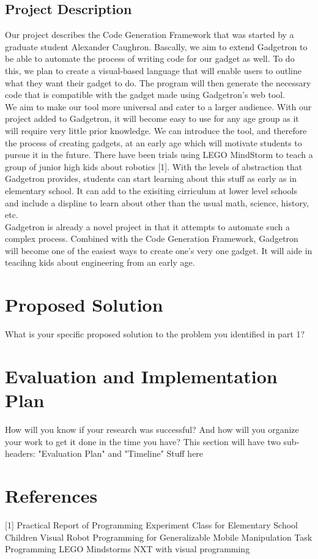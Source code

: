 \documentclass[12pt]{article}
\begin{document}
\subsection{Project Description}
	Our project describes the Code Generation Framework that was started by a graduate student Alexander Caughron.
	Bascally, we aim to extend Gadgetron to be able to automate the process of writing code for our gadget as well. 
	To do this, we plan to create a visual-based language that will enable users to outline what they want their gadget
	to do. The program will then generate the necessary code that is compatible with the gadget made using 
	Gadgetron's web tool.\\[7pt]
	We aim to make our tool more universal and cater to a larger audience. With our project added to Gadgetron, 
	it will become easy to use for any age group as it will require very little prior knowledge. We can introduce the 
	tool, and therefore the process of creating gadgets, at an early age which will motivate students to pursue it
	in the future. There have been trials using LEGO MindStorm to teach a group of junior high kids about robotics [1]. 
	With the levels of abstraction that Gadgetron provides, students can start learning about this stuff as early as 
	in elementary school. It can add to the exisiting cirriculum at lower level schools and include a displine to learn
	about other than the usual math, science, history, etc.\\[7pt]
	Gadgetron is already a novel project in that it attempts to automate such a complex process.  Combined
	with the Code Generation Framework, Gadgetron will become one of the easiest ways to create one's very one
	gadget. It will aide in teacihng kids about engineering from an early age.  

\section{Proposed Solution}
What is your specific proposed solution to the problem you identified in part 1?

\section{Evaluation and Implementation Plan}
How will you know if your research was successful?  And how will you organize your work to get it done in the time you have?  This section will have two sub-headers: "Evaluation Plan" and "Timeline"
Stuff here



\section {References}
[1] Practical Report of Programming Experiment Class for Elementary School Children
\newline
[2] Visual Robot Programming for Generalizable Mobile Manipulation Task 
\newline
[3]  Programming LEGO Mindstorms NXT with visual programming
\newline
\end{document}
